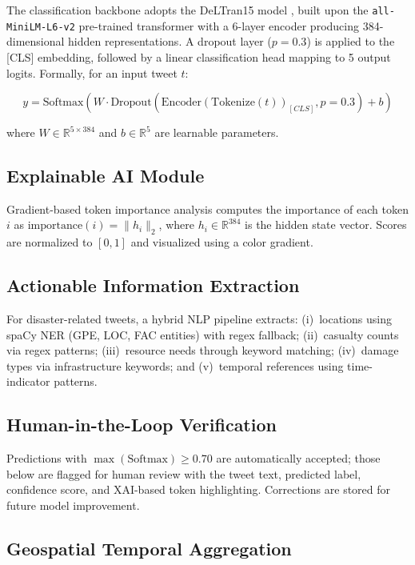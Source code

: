 \documentclass[pdflatex,sn-mathphys-num]{sn-jnl}
\theoremstyle{thmstyleone}%
\theoremstyle{thmstyletwo}%
\theoremstyle{thmstylethree}%
\begin{document}
The classification backbone adopts the DeLTran15 model \cite{ref16}, built upon the \texttt{all-MiniLM-L6-v2} pre-trained transformer with a 6-layer encoder producing 384-dimensional hidden representations. A dropout layer ($p = 0.3$) is applied to the [CLS] embedding, followed by a linear classification head mapping to 5 output logits. Formally, for an input tweet $t$:

\begin{equation}
y = \text{Softmax}(W \cdot \text{Dropout}(\text{Encoder}(\text{Tokenize}(t))_{[CLS]}, p\!=\!0.3) + b)
\end{equation}

where $W \in \mathbb{R}^{5 \times 384}$ and $b \in \mathbb{R}^{5}$ are learnable parameters.

\subsection{Explainable AI Module}

Gradient-based token importance analysis computes the importance of each token $i$ as $\text{importance}(i) = \|h_i\|_2$, where $h_i \in \mathbb{R}^{384}$ is the hidden state vector. Scores are normalized to $[0,1]$ and visualized using a color gradient.

\subsection{Actionable Information Extraction}

For disaster-related tweets, a hybrid NLP pipeline extracts: (i)~locations using spaCy NER (GPE, LOC, FAC entities) with regex fallback; (ii)~casualty counts via regex patterns; (iii)~resource needs through keyword matching; (iv)~damage types via infrastructure keywords; and (v)~temporal references using time-indicator patterns.

\subsection{Human-in-the-Loop Verification}

Predictions with $\max(\text{Softmax}) \geq 0.70$ are automatically accepted; those below are flagged for human review with the tweet text, predicted label, confidence score, and XAI-based token highlighting. Corrections are stored for future model improvement.

\subsection{Geospatial Temporal Aggregation}
\end{document}
